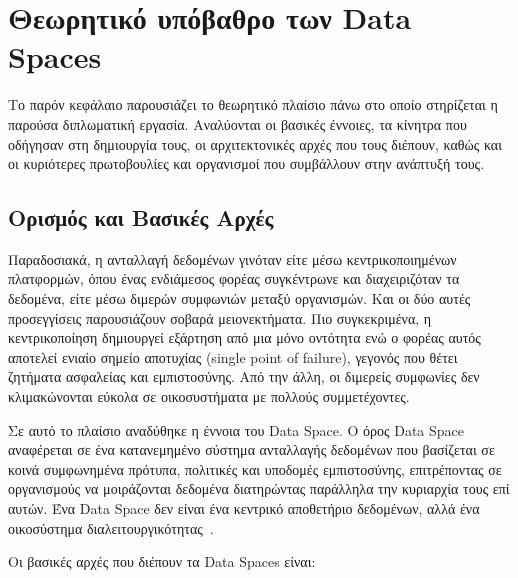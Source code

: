 \chapter{Θεωρητικό υπόβαθρο των \textlatin{Data Spaces}}
\label{ch:data-spaces}

Το παρόν κεφάλαιο παρουσιάζει το θεωρητικό πλαίσιο πάνω στο οποίο στηρίζεται η παρούσα
διπλωματική εργασία. Αναλύονται οι βασικές έννοιες, τα κίνητρα που οδήγησαν
στη δημιουργία τους, οι αρχιτεκτονικές αρχές που τους διέπουν, καθώς και οι κυριότερες
πρωτοβουλίες και οργανισμοί που συμβάλλουν στην ανάπτυξή τους.

\section{Ορισμός και Βασικές Αρχές}
\label{sec:definition}

Παραδοσιακά, η ανταλλαγή δεδομένων γινόταν είτε μέσω κεντρικοποιημένων πλατφορμών,
όπου ένας ενδιάμεσος φορέας συγκέντρωνε και διαχειριζόταν τα δεδομένα, είτε μέσω
διμερών συμφωνιών μεταξύ οργανισμών. Και οι δύο αυτές προσεγγίσεις παρουσιάζουν
σοβαρά μειονεκτήματα. Πιο συγκεκριμένα, η κεντρικοποίηση δημιουργεί εξάρτηση από μια μόνο οντότητα
ενώ ο φορέας αυτός αποτελεί ενιαίο σημείο αποτυχίας (\textlatin{single point of failure}), γεγονός που θέτει ζητήματα ασφαλείας και εμπιστοσύνης.
Από την άλλη, οι διμερείς συμφωνίες δεν κλιμακώνονται εύκολα
σε οικοσυστήματα με πολλούς συμμετέχοντες.

Σε αυτό το πλαίσιο αναδύθηκε η έννοια του \textlatin{Data Space}. Ο όρος \textlatin{Data Space} 
αναφέρεται σε ένα κατανεμημένο σύστημα ανταλλαγής δεδομένων που βασίζεται σε κοινά συμφωνημένα πρότυπα, πολιτικές και υποδομές εμπιστοσύνης,
επιτρέποντας σε οργανισμούς να μοιράζονται δεδομένα διατηρώντας παράλληλα την κυριαρχία
τους επί αυτών. Ένα \textlatin{Data Space} δεν είναι ένα κεντρικό αποθετήριο δεδομένων,
αλλά ένα οικοσύστημα διαλειτουργικότητας~\cite{otto2022}.

Οι βασικές αρχές που διέπουν τα \textlatin{Data Spaces} είναι:

